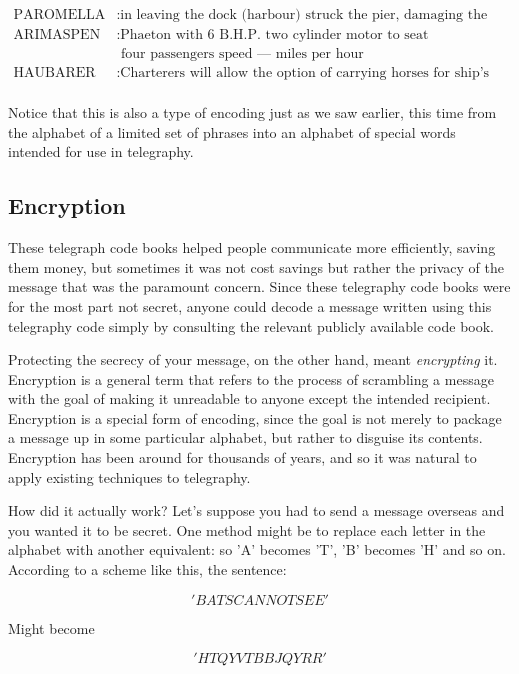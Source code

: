 \documentclass[UTF8]{book}
\begin{document}
\begin{CJK}{UTF8}{gbsn}
\begin{align*}
	\text{PAROMELLA} &: \text{in leaving the dock (harbour) struck the pier, damaging the stern} \\
	\text{ARIMASPEN } &: \text{Phaeton with 6 B.H.P. two cylinder motor to seat} \\
         & \text{   four passengers speed — miles per hour} \\
	\text{HAUBARER  } &: \text{Charterers will allow the option of carrying horses for ship's benefit} \\
\end{align*}

Notice that this is also a type of encoding just as we saw earlier, this time from the alphabet of a limited set of phrases into an alphabet of special words intended for use in telegraphy.

\subsection{Encryption}

These telegraph code books helped people communicate more efficiently, saving them money, but sometimes it was not cost savings but rather the privacy of the message that was the paramount concern. Since these telegraphy code books were for the most part not secret, anyone could decode a message written using this telegraphy code simply by consulting the relevant publicly available code book.

Protecting the secrecy of your message, on the other hand, meant \emph{encrypting} it. Encryption is a general term that refers to the process of scrambling a message with the goal of making it unreadable to anyone except the intended recipient. Encryption is a special form of encoding, since the goal is not merely to package a message up in some particular alphabet, but rather to disguise its contents. Encryption has been around for thousands of years, and so it was natural to apply existing techniques to telegraphy.

How did it actually work? Let's suppose you had to send a message overseas and you wanted it to be secret. One method might be to replace each letter in the alphabet with another equivalent: so 'A' becomes 'T', 'B' becomes 'H' and so on. According to a scheme like this, the sentence:

   \[ 'BATS CANNOT SEE' \]

Might become

   \[ 'HTQY VTBBJQ YRR' \]


\end{CJK}
\end{document}
